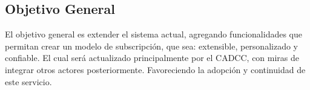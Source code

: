 \documentclass[guia]{upropuesta}
\begin{document}


  \subsection*{Objetivo General}\label{sec:obj-g}
       El objetivo general es extender el sistema actual, agregando funcionalidades que permitan crear un modelo de subscripción, que sea: extensible, personalizado y confiable. El cual será actualizado principalmente por el CADCC, con miras de integrar otros actores posteriormente. Favoreciendo la adopción y continuidad de este servicio.
          
          
        
\end{document}
